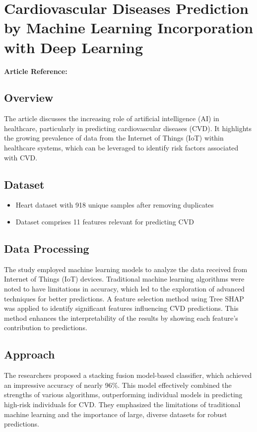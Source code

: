 \section{Cardiovascular Diseases Prediction by Machine Learning Incorporation with Deep Learning}
\textbf{Article Reference:} \cite{article_8}

\subsection*{Overview}
The article discusses the increasing role of artificial intelligence (AI) in healthcare, particularly in predicting cardiovascular diseases (CVD). It highlights the growing prevalence of data from the Internet of Things (IoT) within healthcare systems, which can be leveraged to identify risk factors associated with CVD.

\subsection*{Dataset}
\begin{itemize}
    \item Heart dataset with 918 unique samples after removing duplicates
    \item Dataset comprises 11 features relevant for predicting CVD
\end{itemize}

\subsection*{Data Processing}
The study employed machine learning models to analyze the data received from Internet of Things (IoT) devices. Traditional machine learning algorithms were noted to have limitations in accuracy, which led to the exploration of advanced techniques for better predictions. A feature selection method using Tree SHAP was applied to identify significant features influencing CVD predictions. This method enhances the interpretability of the results by showing each feature's contribution to predictions.

\subsection*{Approach}
The researchers proposed a stacking fusion model-based classifier, which achieved an impressive accuracy of nearly 96\%. This model effectively combined the strengths of various algorithms, outperforming individual models in predicting high-risk individuals for CVD. They emphasized the limitations of traditional machine learning and the importance of large, diverse datasets for robust predictions.

